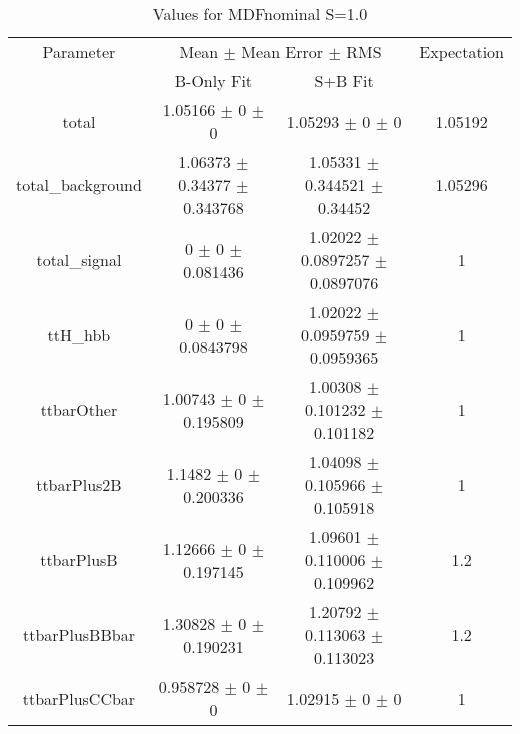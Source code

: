 \begin{table}
\centering
\caption{Values for MDFnominal S=1.0}
\begin{tabular}{cccc}
\toprule
Parameter & \multicolumn{2}{c}{Mean $\pm$ Mean Error $\pm$ RMS} & Expectation\\
 & B-Only Fit & S+B Fit & \\
\midrule
total & \num{1.05166} $\pm$ \num{0} $\pm$ \num{0} & \num{1.05293} $\pm$ \num{0} $\pm$ \num{0} & \num{1.05192}\\
total\_background & \num{1.06373} $\pm$ \num{0.34377} $\pm$ \num{0.343768} & \num{1.05331} $\pm$ \num{0.344521} $\pm$ \num{0.34452} & \num{1.05296}\\
total\_signal & \num{0} $\pm$ \num{0} $\pm$ \num{0.081436} & \num{1.02022} $\pm$ \num{0.0897257} $\pm$ \num{0.0897076} & \num{1}\\
ttH\_hbb & \num{0} $\pm$ \num{0} $\pm$ \num{0.0843798} & \num{1.02022} $\pm$ \num{0.0959759} $\pm$ \num{0.0959365} & \num{1}\\
ttbarOther & \num{1.00743} $\pm$ \num{0} $\pm$ \num{0.195809} & \num{1.00308} $\pm$ \num{0.101232} $\pm$ \num{0.101182} & \num{1}\\
ttbarPlus2B & \num{1.1482} $\pm$ \num{0} $\pm$ \num{0.200336} & \num{1.04098} $\pm$ \num{0.105966} $\pm$ \num{0.105918} & \num{1}\\
ttbarPlusB & \num{1.12666} $\pm$ \num{0} $\pm$ \num{0.197145} & \num{1.09601} $\pm$ \num{0.110006} $\pm$ \num{0.109962} & \num{1.2}\\
ttbarPlusBBbar & \num{1.30828} $\pm$ \num{0} $\pm$ \num{0.190231} & \num{1.20792} $\pm$ \num{0.113063} $\pm$ \num{0.113023} & \num{1.2}\\
ttbarPlusCCbar & \num{0.958728} $\pm$ \num{0} $\pm$ \num{0} & \num{1.02915} $\pm$ \num{0} $\pm$ \num{0} & \num{1}\\
\bottomrule
\end{tabular}
\end{table}